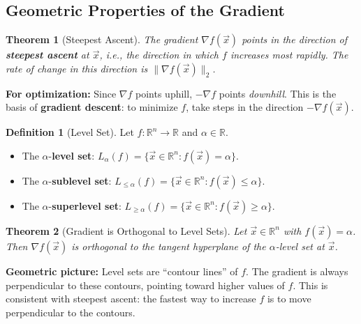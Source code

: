 \documentclass[10pt, twocolumn]{article}
\theoremstyle{definition}
\newtheorem{definition}{Definition}
\theoremstyle{plain}
\newtheorem{theorem}{Theorem}
\newcommand{\RR}{\mathbb{R}}
\begin{document}
\subsection{Geometric Properties of the Gradient}

\begin{theorem}[Steepest Ascent]
The gradient $\nabla f(\vec{x})$ points in the direction of \textbf{steepest ascent} at $\vec{x}$, i.e., the direction in which $f$ increases most rapidly. The rate of change in this direction is $\|\nabla f(\vec{x})\|_2$.
\end{theorem}

\begin{tcolorbox}[colframe=black!50]
\textbf{For optimization:} Since $\nabla f$ points uphill, $-\nabla f$ points \emph{downhill}. This is the basis of \textbf{gradient descent}: to minimize $f$, take steps in the direction $-\nabla f(\vec{x})$.
\end{tcolorbox}

\begin{definition}[Level Set]
Let $f: \RR^n \to \RR$ and $\alpha \in \RR$.
\begin{itemize}
    \item The $\alpha$-\textbf{level set}: $L_\alpha(f) = \{\vec{x} \in \RR^n : f(\vec{x}) = \alpha\}$.
    \item The $\alpha$-\textbf{sublevel set}: $L_{\le \alpha}(f) = \{\vec{x} \in \RR^n : f(\vec{x}) \le \alpha\}$.
    \item The $\alpha$-\textbf{superlevel set}: $L_{\ge \alpha}(f) = \{\vec{x} \in \RR^n : f(\vec{x}) \ge \alpha\}$.
\end{itemize}
\end{definition}

\begin{theorem}[Gradient is Orthogonal to Level Sets]
Let $\vec{x} \in \RR^n$ with $f(\vec{x}) = \alpha$. Then $\nabla f(\vec{x})$ is orthogonal to the tangent hyperplane of the $\alpha$-level set at $\vec{x}$.
\end{theorem}

\begin{tcolorbox}[colframe=black!50]
\textbf{Geometric picture:} Level sets are ``contour lines'' of $f$. The gradient is always perpendicular to these contours, pointing toward higher values of $f$. This is consistent with steepest ascent: the fastest way to increase $f$ is to move perpendicular to the contours.
\end{tcolorbox}
\end{document}
